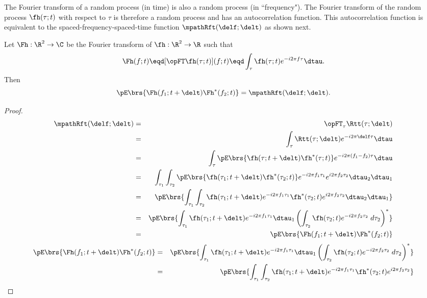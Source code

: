 The Fourier transform of a random process (in time) is also 
a random process (in ``frequency").
The Fourier transform of the random process $\fh(\tau;t)$
with respect to $\tau$ is therefore a random process and has 
an autocorrelation function.
This autocorrelation function is equivalent to 
the spaced-frequency-spaced-time function $\mpathRft(\delf;\delt)$
as shown next.
\begin{proposition}
Let $\Fh:\R^2\to\C$ be the Fourier transform of $\fh:\R^2\to\R$ 
such that
  \[ \Fh(f;t) \eqd [\opFT \fh(\tau;t)](f;t) 
              \eqd \int_\tau \fh(\tau;t) e^{-i2\pi f\tau}\dtau.
  \]
Then
  \[ \pE\brs{\Fh(f_1;t+\delt)\Fh^\ast(f_2;t)} = \mpathRft(\delf;\delt). \]
\end{proposition}
\begin{proof}
\begin{eqnarray*}
   \mpathRft(\delf;\delt)
     &=& \opFT_\tau \Rtt(\tau;\delt)
   \\&=& \int_{\tau}\Rtt(\tau;\delt) e^{-i2\pi \delf \tau} \dtau
   \\&=& \int_{\tau}\pE\brs{\fh(\tau;t+\delt) \fh^\ast(\tau;t) }
              e^{-i2\pi (f_1-f_2)\tau}\dtau
   \\&=& \int_{\tau_1}\int_{\tau_2}\pE\brs{
             \fh(\tau_1;t+\delt) \fh^\ast(\tau_2;t) }
              e^{-i2\pi f_1\tau_1}e^{i2\pi f_2\tau_2} 
            \dtau_2 \dtau_1
   \\&=& \pE\brs{\int_{\tau_1}\int_{\tau_2}
             \fh     (\tau_1;t+\delt) e^{-i2\pi f_1\tau_1}
             \fh^\ast(\tau_2;t      ) e^{i2\pi f_2\tau_2} 
            \dtau_2 \dtau_1}
   \\&=& \pE\brs{      \int_{\tau_1}\fh(\tau_1;t+\delt) e^{-i2\pi f_1\tau_1} \dtau_1
             \left(\int_{\tau_2}\fh(\tau_2;t      ) e^{-i2\pi f_2\tau_2} \;d\tau_2\right)^\ast
            }
   \\&=& \pE\brs{\Fh(f_1;t+\delt)\Fh^\ast(f_2;t)}
\end{eqnarray*}
\fi
\begin{eqnarray*}
   \pE\brs{\Fh(f_1;t+\delt)\Fh^\ast(f_2;t)}
     &=& \pE\brs{      \int_{\tau_1}\fh(\tau_1;t+\delt) e^{-i2\pi f_1\tau_1} \dtau_1
             \left(\int_{\tau_2}\fh(\tau_2;t      ) e^{-i2\pi f_2\tau_2} \;d\tau_2\right)^\ast
            }
   \\&=& \pE\brs{\int_{\tau_1}\int_{\tau_2}
             \fh     (\tau_1;t+\delt) e^{-i2\pi f_1\tau_1}
             \fh^\ast(\tau_2;t      ) e^{i2\pi f_2\tau_2} 
}
\end{eqnarray*}
\end{proof}
